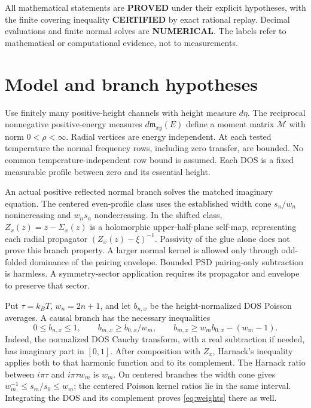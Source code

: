 \documentclass[11pt]{article}
\begin{document}
All mathematical statements are \textbf{PROVED} under their explicit hypotheses, with the finite covering inequality \textbf{CERTIFIED} by exact rational replay. Decimal evaluations and finite normal solves are \textbf{NUMERICAL}. The labels refer to mathematical or computational evidence, not to measurements.

\section{Model and branch hypotheses}
Use finitely many positive-height channels with height measure $d\eta$. The reciprocal nonnegative positive-energy measures $d\mathfrak m_{xy}(E)$ define a moment matrix $\mathcal M$ with norm $0<\rho<\infty$. Radial vertices are energy independent. At each tested temperature the normal frequency rows, including zero transfer, are bounded. No common temperature-independent row bound is assumed. Each DOS is a fixed measurable profile between zero and its essential height.

An actual positive reflected normal branch solves the matched imaginary equation. The centered even-profile class uses the established width cone $s_n/w_n$ nonincreasing and $w_ns_n$ nondecreasing. In the shifted class, $Z_x(z)=z-\Sigma_x(z)$ is a holomorphic upper-half-plane self-map, representing each radial propagator $(Z_x(z)-\xi)^{-1}$. Passivity of the glue alone does not prove this branch property. A larger normal kernel is allowed only through odd-folded dominance of the pairing envelope. Bounded PSD pairing-only subtraction is harmless. A symmetry-sector application requires its propagator and envelope to preserve that sector.

Put $\tau=k_BT$, $w_n=2n+1$, and let $b_{n,x}$ be the height-normalized DOS Poisson averages. A causal branch has the necessary inequalities
\begin{equation}
 0\le b_{n,x}\le1,\qquad
 b_{m,x}\ge b_{0,x}/w_m,\qquad
 b_{m,x}\ge w_mb_{0,x}-(w_m-1).\label{eq:weights}
\end{equation}
Indeed, the normalized DOS Cauchy transform, with a real subtraction if needed, has imaginary part in $[0,1]$. After composition with $Z_x$, Harnack's inequality applies both to that harmonic function and to its complement. The Harnack ratio between $i\pi\tau$ and $i\pi\tau w_m$ is $w_m$. On centered branches the width cone gives $w_m^{-1}\le s_m/s_0\le w_m$; the centered Poisson kernel ratios lie in the same interval. Integrating the DOS and its complement proves \eqref{eq:weights} there as well.
\end{document}
